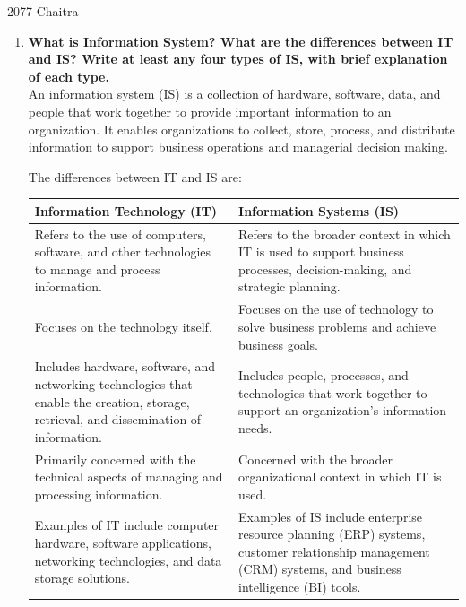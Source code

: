 \documentclass[12pt]{article}
\begin{document}
{\Large 2077 Chaitra}
\begin{enumerate}
    \item {\bfseries What is Information System? What are the differences between IT and IS? Write at least any four types of IS, with brief explanation of each type.\\}
    An information system (IS) is a collection of hardware, software, data, and people that work together to provide important information to an organization. 
    It enables organizations to collect, store, process, and distribute information to support business operations and managerial decision making. 
   
    The differences between IT and IS are: 
    \begin{table}[h!]
        \centering
        \begin{tabular}{|L{6cm}|L{6cm}|}
            \hline
            \textbf{Information Technology (IT)} & \textbf{Information Systems (IS)} \\
            \hline
            Refers to the use of computers, software, and other technologies to manage and process information. & Refers to the broader context in which IT is used to support business processes, decision-making, and strategic planning. \\
            \hline
            Focuses on the technology itself. & Focuses on the use of technology to solve business problems and achieve business goals. \\
            \hline
            Includes hardware, software, and networking technologies that enable the creation, storage, retrieval, and dissemination of information. & Includes people, processes, and technologies that work together to support an organization's information needs. \\
            \hline
            Primarily concerned with the technical aspects of managing and processing information. & Concerned with the broader organizational context in which IT is used. \\
            \hline
            Examples of IT include computer hardware, software applications, networking technologies, and data storage solutions. & Examples of IS include enterprise resource planning (ERP) systems, customer relationship management (CRM) systems, and business intelligence (BI) tools. \\
            \hline
            \end{tabular}
    \end{table}
   

\end{enumerate}
\end{document}
